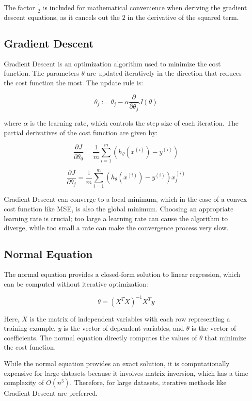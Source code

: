 \documentclass{article}
\theoremstyle{definition}
\theoremstyle{theorem}
\theoremstyle{theorem}
\theoremstyle{theorem}
\theoremstyle{theorem}
\theoremstyle{definition}
\theoremstyle{definition}
\theoremstyle{definition}
\theoremstyle{definition}
\theoremstyle{definition}
\begin{document}
The factor \( \frac{1}{2} \) is included for mathematical convenience when deriving the gradient descent equations, as it cancels out the \( 2 \) in the derivative of the squared term.

\subsection{Gradient Descent}

Gradient Descent is an optimization algorithm used to minimize the cost function. The parameters \( \theta \) are updated iteratively in the direction that reduces the cost function the most. The update rule is:

\[
\theta_j := \theta_j - \alpha \frac{\partial}{\partial \theta_j} J(\theta)
\]

where \( \alpha \) is the learning rate, which controls the step size of each iteration. The partial derivatives of the cost function are given by:

\[
\frac{\partial J}{\partial \theta_0} = \frac{1}{m} \sum_{i=1}^{m} (h_\theta(x^{(i)}) - y^{(i)})
\]

\[
\frac{\partial J}{\partial \theta_j} = \frac{1}{m} \sum_{i=1}^{m} (h_\theta(x^{(i)}) - y^{(i)}) x_j^{(i)}
\]

Gradient Descent can converge to a local minimum, which in the case of a convex cost function like MSE, is also the global minimum. Choosing an appropriate learning rate is crucial; too large a learning rate can cause the algorithm to diverge, while too small a rate can make the convergence process very slow.

\subsection{Normal Equation}

The normal equation provides a closed-form solution to linear regression, which can be computed without iterative optimization:

\[
\theta = (X^T X)^{-1} X^T y
\]

Here, \( X \) is the matrix of independent variables with each row representing a training example, \( y \) is the vector of dependent variables, and \( \theta \) is the vector of coefficients. The normal equation directly computes the values of \( \theta \) that minimize the cost function.

While the normal equation provides an exact solution, it is computationally expensive for large datasets because it involves matrix inversion, which has a time complexity of \( O(n^3) \). Therefore, for large datasets, iterative methods like Gradient Descent are preferred.
\end{document}
